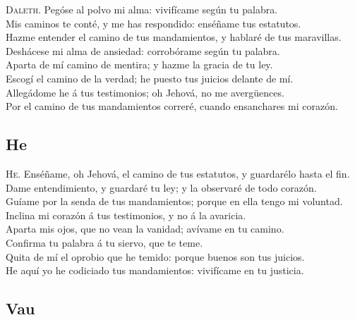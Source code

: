  \textsc{Daleth}. Pegóse al polvo mi alma: vivifícame
según tu palabra.\\
 Mis caminos te conté, y me has respondido: enséñame tus
estatutos.\\
 Hazme entender el camino de tus mandamientos, y hablaré
de tus maravillas.\\
 Deshácese mi alma de ansiedad: corrobórame según tu
palabra.\\
 Aparta de mí camino de mentira; y hazme la gracia de tu
ley.\\
 Escogí el camino de la verdad; he puesto tus juicios
delante de mí.\\
 Allegádome he á tus testimonios; oh Jehová, no me
avergüences.\\
 Por el camino de tus mandamientos correré, cuando
ensanchares mi corazón.

\hypertarget{he}{%
\subsection{He}\label{he}}

 \textsc{He}. Enséñame, oh Jehová, el camino de tus
estatutos, y guardarélo hasta el fin.\\
 Dame entendimiento, y guardaré tu ley; y la observaré de
todo corazón.\\
 Guíame por la senda de tus mandamientos; porque en ella
tengo mi voluntad.\\
 Inclina mi corazón á tus testimonios, y no á la
avaricia.\\
 Aparta mis ojos, que no vean la vanidad; avívame en tu
camino.\\
 Confirma tu palabra á tu siervo, que te teme.\\
 Quita de mí el oprobio que he temido: porque buenos son
tus juicios.\\
 He aquí yo he codiciado tus mandamientos: vivifícame en
tu justicia.

\hypertarget{vau}{%
\subsection{Vau}\label{vau}}


